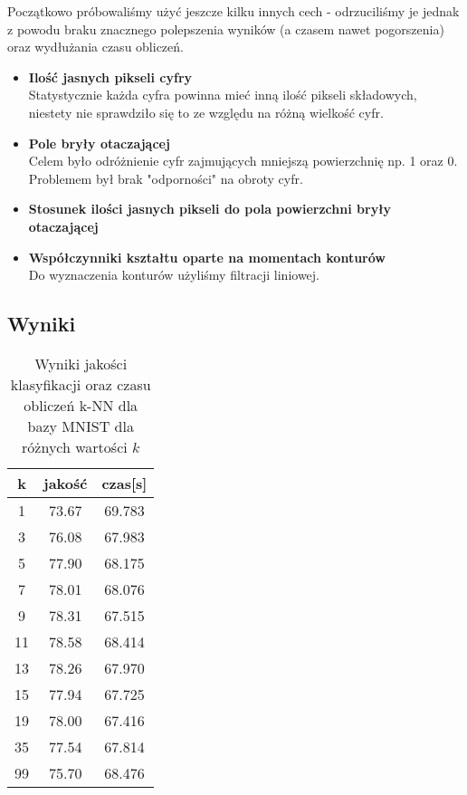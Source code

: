 \documentclass{classrep}
\begin{document}
Początkowo próbowaliśmy użyć jeszcze kilku innych cech - odrzuciliśmy je jednak z powodu braku znacznego polepszenia wyników (a czasem nawet pogorszenia) oraz wydłużania czasu obliczeń.
\begin{itemize}
\item \textbf{Ilość jasnych pikseli cyfry}\\
 Statystycznie każda cyfra powinna mieć inną ilość pikseli składowych, niestety nie sprawdziło się to ze względu na różną wielkość cyfr.
\item \textbf{Pole bryły otaczającej}\\
 Celem było odróżnienie cyfr zajmujących mniejszą powierzchnię np. 1 oraz 0. Problemem był brak "odporności" na obroty cyfr.
\item \textbf{Stosunek ilości jasnych pikseli do pola powierzchni bryły otaczającej}
\item \textbf{Współczynniki kształtu oparte na momentach konturów}\\
Do wyznaczenia konturów użyliśmy filtracji liniowej.
\end{itemize}

\subsection{Wyniki}
\begin{table}[h!]
  \centering
  \caption{Wyniki jakości klasyfikacji oraz czasu obliczeń k-NN dla bazy MNIST dla różnych wartości $k$}
  \label{tab:tab1}
  \begin{tabular}{|c|c|c|}
    \hline
	k & jakość & czas[s]\\
    \hline
	1 & 73.67 & 69.783\\
    \hline
	3 & 76.08 & 67.983\\
	\hline
	5 & 77.90 & 68.175\\
	\hline
	7 & 78.01 & 68.076\\
	\hline
	9 & 78.31 & 67.515\\
	\hline
	11 & 78.58 & 68.414\\
	\hline
	13 & 78.26 & 67.970\\
	\hline
	15 & 77.94 & 67.725\\
	\hline
	19 & 78.00 & 67.416\\
	\hline
	35 & 77.54 & 67.814\\
	\hline
	99 & 75.70 & 68.476\\
	\hline
  \end{tabular}
\end{table}
\end{document}
